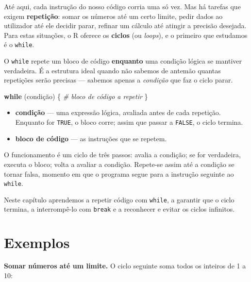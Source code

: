 \documentclass[
  portuguese,
  11pt,
  openany]{book}
\newenvironment{Shaded}{\begin{snugshade}}{\end{snugshade}}
\newcommand{\CommentTok}[1]{\textcolor[rgb]{0.56,0.35,0.01}{\textit{#1}}}
\newcommand{\ControlFlowTok}[1]{\textcolor[rgb]{0.13,0.29,0.53}{\textbf{#1}}}
\newcommand{\NormalTok}[1]{#1}
\providecommand{\tightlist}{%
  \setlength{\itemsep}{0pt}\setlength{\parskip}{0pt}}
\begin{document}
Até aqui, cada instrução do nosso código corria uma só vez. Mas há tarefas que
exigem \textbf{repetição}: somar os números até um certo limite, pedir dados ao
utilizador até ele decidir parar, refinar um cálculo até atingir a precisão desejada.
Para estas situações, o R oferece os \textbf{ciclos} (ou \emph{loops}), e o primeiro que
estudamos é o \texttt{while}.

O \texttt{while} repete um bloco de código \textbf{enquanto} uma condição lógica se mantiver
verdadeira. É a estrutura ideal quando não sabemos de antemão quantas repetições
serão precisas --- sabemos apenas a \emph{condição} que faz o ciclo parar.

\begin{Shaded}
\begin{Highlighting}[]
\ControlFlowTok{while}\NormalTok{ (condição) \{}
  \CommentTok{\# bloco de código a repetir}
\NormalTok{\}}
\end{Highlighting}
\end{Shaded}

\begin{itemize}
\tightlist
\item
  \textbf{condição} --- uma expressão lógica, avaliada antes de cada repetição. Enquanto for
  \texttt{TRUE}, o bloco corre; assim que passar a \texttt{FALSE}, o ciclo termina.
\item
  \textbf{bloco de código} --- as instruções que se repetem.
\end{itemize}

O funcionamento é um ciclo de três passos: avalia a condição; se for verdadeira,
executa o bloco; volta a avaliar a condição. Repete-se assim até a condição se tornar
falsa, momento em que o programa segue para a instrução seguinte ao \texttt{while}.

Neste capítulo aprendemos a repetir código com \texttt{while}, a garantir que o ciclo
termina, a interrompê-lo com \texttt{break} e a reconhecer e evitar os ciclos infinitos.

\section{Exemplos}\label{exemplos}

\textbf{Somar números até um limite.} O ciclo seguinte soma todos os inteiros de 1 a 10:
\end{document}
